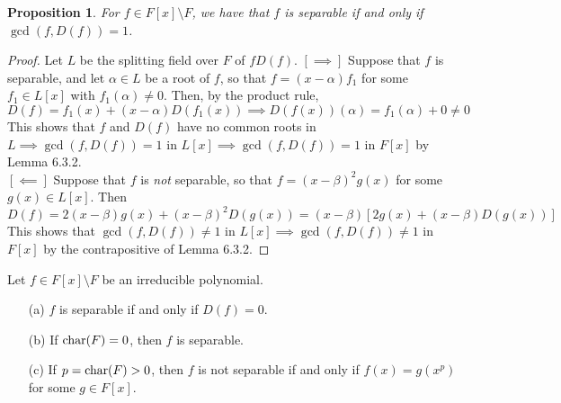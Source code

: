 \documentclass[11pt]{book}
\newcounter{counter}
\newtheorem{proposition}[counter]{Proposition}   \newtheorem{problem}[counter]{Problem}   \newtheorem*{proposition*}{Proposition}   \newtheorem*{lemma*}{Lemma}
\theoremstyle{definition}   \newtheorem{defn}[counter]{Definition} %
\newcommand{\bs}{\setminus}   \newcommand{\A}{\mathcal{A}}   \newcommand{\sy}{\textnormal{Syl}}   \newcommand{\size}[1]{\left| #1 \right|}
\newcommand{\vs}{\vspace{8pt}}   \newcommand{\hs}{\hspace{8pt}}
\numberwithin{counter}{chapter}
\begin{document}
\vs

\begin{proposition}
For $f \in F[x] \bs F$, we have that $f$ is separable if and only if $\gcd(f,D(f)) = 1$. 
\end{proposition}

\begin{proof}
Let $L$ be the splitting field over $F$ of $f D(f)$. $[\implies]$ Suppose that $f$ is separable, and let $\alpha \in L$ be a root of $f$, so that $f = (x-\alpha) f_1$ for some $f_1 \in L[x]$ with $f_1(\alpha) \ne 0$. Then, by the product rule,
	\[D(f) = f_1(x) + (x-\alpha) D(f_1(x)) \implies D(f(x))(\alpha) = f_1(\alpha) + 0 \ne 0 \]
This shows that $f$ and $D(f)$ have no common roots in $L \implies \gcd(f,D(f)) = 1$ in $L[x] \implies \gcd(f,D(f)) = 1$ in $F[x]$ by Lemma 6.3.2. \\

$[\impliedby]$ Suppose that $f$ is \emph{not} separable, so that $f = (x-\beta)^2 g(x)$ for some $g(x) \in L[x]$. Then 
	\[D(f) = 2(x-\beta) g(x) + (x-\beta)^2 D(g(x)) = (x-\beta)[2g(x) + (x-\beta) D(g(x))] \]
This shows that $\gcd(f,D(f)) \ne 1$ in $L[x] \implies \gcd(f,D(f)) \ne 1$ in $F[x]$ by the contrapositive of Lemma 6.3.2. 
\end{proof}

\vs

\begin{corollary}
Let $f \in F[x] \bs F$ be an irreducible polynomial.
\begin{enumerate}
\item[(a)] $f$ is separable if and only if $D(f) = 0$. 
\item[(b)] If $\textnormal{char}(F) = 0$, then $f$ is separable. 
\item[(c)] If $p = \textnormal{char}(F) > 0$, then $f$ is not separable if and only if $f(x) = g(x^p)$ for some $g \in F[x]$. 
\end{enumerate}
\end{corollary}
\end{document}
